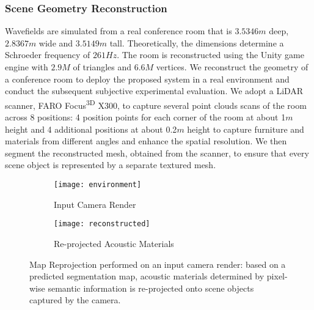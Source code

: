 \subsubsection{Scene Geometry Reconstruction}
Wavefields are simulated from a real conference room that is $3.5346m$ deep, $2.8367m$ wide and $3.5149m$ tall. Theoretically, the dimensions determine a Schroeder frequency of $261Hz$. The room is reconstructed using the Unity game engine with $2.9M$ of triangles and $6.6M$ vertices.
We reconstruct the geometry of a conference room to deploy the proposed system in a real environment and conduct the subsequent subjective experimental evaluation. We adopt a LiDAR scanner, FARO Focus\textsuperscript{3D} X300, to capture several point clouds scans of the room across 8 positions: 4 position points for each corner of the room at about 1$m$ height and 4 additional positions at about 0.2$m$ height to capture furniture and materials from different angles and enhance the spatial resolution. We then segment the reconstructed mesh, obtained from the scanner, to ensure that every scene object is represented by a separate textured mesh.
\begin{figure}
    \centering
    \begin{subfigure}[t]{0.49\textwidth}
       \centering
       \texttt{[image: environment]}
       \caption{Input Camera Render}
       \label{fig:chi-input-env}
    \end{subfigure}
    \begin{subfigure}[t]{0.49\textwidth}
       \centering
       \texttt{[image: reconstructed]}
       \caption{Re-projected Acoustic Materials}
       \label{fig:chi-reconstructed-env}
    \end{subfigure}
\caption{Map Reprojection performed on an input camera render: based on a predicted segmentation map, acoustic materials determined by pixel-wise semantic information is re-projected onto scene objects captured by the camera.}
\label{fig:chi-scanning}
\end{figure}


